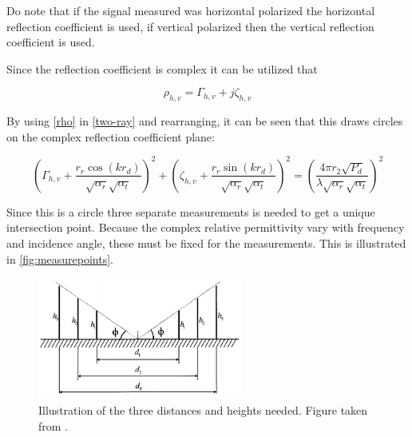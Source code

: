Do note that if the signal measured was horizontal polarized the horizontal reflection coefficient is used, if vertical polarized then the vertical reflection coefficient is used.

Since the reflection coefficient is complex it can be utilized that

\begin{equation}\label{rho}
\rho_{h,v} = \Gamma_{h,v}+j\zeta_{h,v}
\end{equation}
\begin{where}
\end{where}

By using \autoref{rho} in \autoref{two-ray} and rearranging, it can be seen that this draws circles on the complex reflection coefficient plane:

\begin{equation}\label{two-ray-circle}
\left(\Gamma_{h,v}+\frac{r_r\cos(kr_d)}{\sqrt{\alpha_r}\sqrt{\alpha_t}}\right)^2+\left(\zeta_{h,v}+\frac{r_r\sin(kr_d)}{\sqrt{\alpha_r}\sqrt{\alpha_t}}\right)^2=\left(\frac{4\pi r_2 \sqrt{P_d}}{\lambda\sqrt{\alpha_r}\sqrt{\alpha_t}}\right)^2
\end{equation}
\begin{where}
\end{where}


Since this is a circle three separate measurements is needed to get a unique intersection point. Because the complex relative permittivity vary with frequency and incidence angle, these must be fixed for the measurements. This is illustrated in \autoref{fig:measurepoints}.

\begin{figure}[H]
\centering
\includegraphics[width=0.6\textwidth]{figure/measurepoints.png}
\caption{Illustration of the three distances and heights needed. Figure taken from \citep{Kim}.}
\label{fig:measurepoints}
\end{figure}

